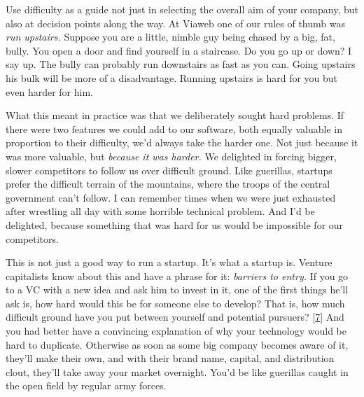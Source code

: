 Use
                    difficulty as a guide not just in selecting the overall aim
                    of your company, but also at decision points along the way.
                    At Viaweb one of our rules of thumb was
                    \emph{run upstairs.} Suppose you are a little, nimble guy
                    being chased by a big, fat, bully. You open a door and find
                    yourself in a staircase. Do you go up or down? I say up. The
                    bully can probably run downstairs as fast as you can. Going
                    upstairs his bulk will be more of a disadvantage. Running
                    upstairs is hard for you but even harder for him.

What
                    this meant in practice was that we deliberately sought hard
                    problems. If there were two features we could add to our
                    software, both equally valuable in proportion to their
                    difficulty, we'd always take the harder one. Not just
                    because it was more valuable, but
                    \emph{because it was harder.} We delighted in forcing
                    bigger, slower competitors to follow us over difficult
                    ground. Like guerillas, startups prefer the difficult
                    terrain of the mountains, where the troops of the central
                    government can't follow. I can remember times when we were
                    just exhausted after wrestling all day with some horrible
                    technical problem. And I'd be delighted, because something
                    that was hard for us would be impossible for our
                    competitors.

This is not just a good way to run a
                    startup. It's what a startup is. Venture capitalists know
                    about this and have a phrase for it:
                    \emph{barriers to entry.} If you go to a VC with a new idea
                    and ask him to invest in it, one of the first things he'll
                    ask is, how hard would this be for someone else to develop?
                    That is, how much difficult ground have you put between
                    yourself and potential pursuers?
                    [\href{\#f7n}{7}]
                    And you had better have a convincing explanation of why your
                    technology would be hard to duplicate. Otherwise as soon as
                    some big company becomes aware of it, they'll make their
                    own, and with their brand name, capital, and distribution
                    clout, they'll take away your market overnight. You'd be
                    like guerillas caught in the open field by regular army
                    forces.


